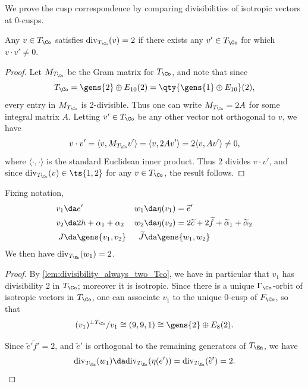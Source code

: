 \documentclass[../../main.tex]{subfiles}
\begin{document}
We prove the cusp correspondence by comparing divisibilities of isotropic vectors at 0-cusps.

\begin{lemma}\label{lem:divisibility_always_two_Tco}
Any $v\in T_\Co$ satisfies $\mathrm{div}_{T_\Co}(v) = 2$ if there exists any $v'\in T_\Co$ for which $v\cdot v' \neq 0$. 
\end{lemma}
\begin{proof}
Let $M_{T_\Co}$ be the Gram matrix for $T_\Co$, and note that since 
\[
T_\Co = \gens{2} \oplus E_{10}(2) = \qty{\gens{1} \oplus E_{10}}(2)
,\]
every entry in $M_{T_\Co}$ is 2-divisible. Thus one can write $M_{T_\Co} = 2A$ for some integral matrix $A$. Letting $v' \in T_\Co$ be any other vector not orthogonal to $v$, we have
    \begin{align*}
        v\cdot v' = \langle v, M_{T_\Co}v' \rangle = \langle v, 2 Av' \rangle 
        = 2\langle v, Av' \rangle \neq 0
    ,\end{align*}
    where $\langle \cdot, \cdot\rangle$ is the standard Euclidean inner product. Thus 2 divides $v\cdot v'$, and since $\mathrm{div}_{T_\Co}(v) \in \ts{1, 2}$ for any $v \in T_\Co$, the result follows.
\end{proof}

\begin{lemma}\label{lem:divisibility_Tco_one}
Fixing notation,
\begin{align*}
    v_1 &\da e' & w_1 &\da \eta(v_1) = \tilde e' \\
    v_2 &\da 2h + \alpha_1 + \alpha_2 & w_2 &\da \eta(v_2) = 2\tilde e + 2\tilde f + \tilde\alpha_1 + \tilde\alpha_2 \\
    J &\da \gens{v_1, v_2} & \tilde J &\da \gens{w_1, w_2}
\end{align*}
We then have $\mathrm{div}_{T_\En}(w_1) = 2$.
\end{lemma}

\begin{proof}
By \cref{lem:divisibility_always_two_Tco}, we have in particular that $v_1$ has divisibility 2 in $T_\Co$; moreover it is isotropic. Since there is a unique $\Gamma_\Co$-orbit of isotropic vectors in $T_\Co$, one can associate $v_1$ to the unique 0-cusp of $F_\Co$, so that 
\[
(v_1)^{\perp T_\Co}/v_1 \cong (9,9,1) \cong \gens{2} \oplus E_8(2)
.\]


Since $\tilde e' \tilde f' = 2$, and $\tilde e'$ is orthogonal to the remaining generators of $T_\En$, we have 
\[
\mathrm{div}_{T_\En}(w_1) \da \mathrm{div}_{T_\En}(\eta(e'))  
 = \mathrm{div}_{T_\En}(\tilde e') = 2
.\]
\end{proof}
\end{document}
